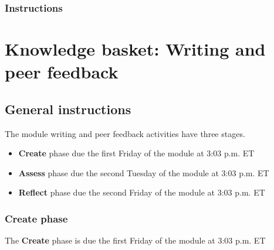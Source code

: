 \documentclass[
  openany]{book}
\begin{document}
\hypertarget{instructions-4}{%
\subsection{Instructions}\label{instructions-4}}

\hypertarget{knowledge-basket-writing-and-peer-feedback}{%
\chapter{Knowledge basket: Writing and peer feedback}\label{knowledge-basket-writing-and-peer-feedback}}

\hypertarget{writinggeneral}{%
\section{General instructions}\label{writinggeneral}}

The module writing and peer feedback activities have three stages.

\begin{itemize}
\item
  \textbf{Create} phase due the first Friday of the module at 3:03 p.m. ET
\item
  \textbf{Assess} phase due the second Tuesday of the module at 3:03 p.m. ET
\item
  \textbf{Reflect} phase due the second Friday of the module at 3:03 p.m. ET
\end{itemize}

\hypertarget{create-phase}{%
\subsection{Create phase}\label{create-phase}}

The \textbf{Create} phase is due the first Friday of the module at 3:03 p.m. ET
\end{document}
